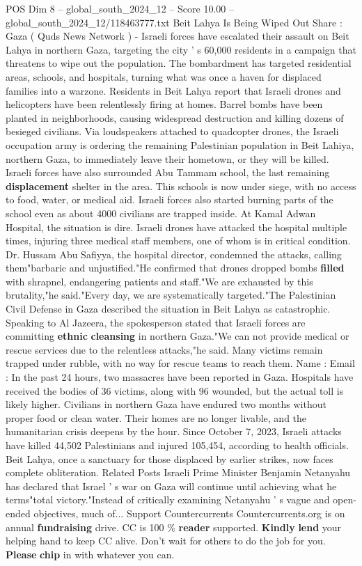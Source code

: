 \begin{textsample}{POS Dim 8 – global\_south\_2024\_12 – Score 10.00 – global\_south\_2024\_12/118463777.txt}  \label{ex:f8_pos_063}
Beit Lahya Is Being Wiped Out Share : Gaza ( Quds News Network ) - Israeli forces have escalated their assault on Beit Lahya in northern Gaza, targeting the city ' s 60,000 residents in a campaign that threatens to wipe out the population.
The bombardment has targeted residential areas, schools, and hospitals, turning what was once a haven for displaced families into a warzone.
Residents in Beit Lahya report that Israeli drones and helicopters have been relentlessly firing at homes.
Barrel bombs have been planted in neighborhoods, causing widespread destruction and killing dozens of besieged civilians.
Via loudspeakers attached to quadcopter drones, the Israeli occupation army is ordering the remaining Palestinian population in Beit Lahiya, northern Gaza, to immediately leave their hometown, or they will be killed.
Israeli forces have also surrounded Abu Tammam school, the last remaining \textbf{displacement} shelter in the area.
This schools is now under siege, with no access to food, water, or medical aid.
Israeli forces also started burning parts of the school even as about 4000 civilians are trapped inside.
At Kamal Adwan Hospital, the situation is dire.
Israeli drones have attacked the hospital multiple times, injuring three medical staff members, one of whom is in critical condition.
Dr.
Hussam Abu Safiyya, the hospital director, condemned the attacks, calling them"barbaric and unjustified."He confirmed that drones dropped bombs \textbf{filled} with shrapnel, endangering patients and staff."We are exhausted by this brutality,"he said."Every day, we are systematically targeted."The Palestinian Civil Defense in Gaza described the situation in Beit Lahya as catastrophic.
Speaking to Al Jazeera, the spokesperson stated that Israeli forces are committing \textbf{ethnic} \textbf{cleansing} in northern Gaza."We can not provide medical or rescue services due to the relentless attacks,"he said.
Many victims remain trapped under rubble, with no way for rescue teams to reach them.
Name : Email : In the past 24 hours, two massacres have been reported in Gaza.
Hospitals have received the bodies of 36 victims, along with 96 wounded, but the actual toll is likely higher.
Civilians in northern Gaza have endured two months without proper food or clean water.
Their homes are no longer livable, and the humanitarian crisis deepens by the hour.
Since October 7, 2023, Israeli attacks have killed 44,502 Palestinians and injured 105,454, according to health officials.
Beit Lahya, once a sanctuary for those displaced by earlier strikes, now faces complete obliteration.
Related Posts Israeli Prime Minister Benjamin Netanyahu has declared that Israel ' s war on Gaza will continue until achieving what he terms"total victory."Instead of critically examining Netanyahu ' s vague and open-ended objectives, much of...
Support Countercurrents Countercurrents.org is on annual \textbf{fundraising} drive.
CC is 100 \% \textbf{reader} supported. \textbf{Kindly} \textbf{lend} your helping hand to keep CC alive.
Don't wait for others to do the job for you. \textbf{Please} \textbf{chip} in with whatever you can.


\end{textsample}
